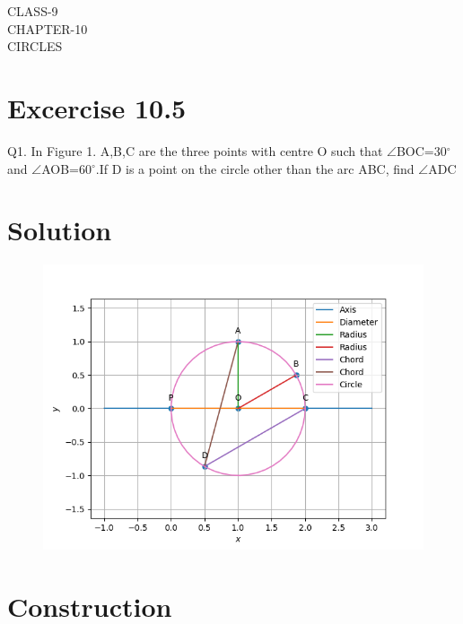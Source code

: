 \documentclass[12pt]{article}
\begin{document}
\begin{center}
\textbf\large{CLASS-9\\CHAPTER-10 \\ CIRCLES}

\end{center}
\section*{Excercise 10.5}

Q1. In Figure 1. A,B,C are the three points with centre O such that $\angle$BOC=30$^\circ$ and $\angle$AOB=60$^\circ$.If D is a point on the circle other than the arc ABC, find $\angle$ADC
\section*{\large Solution}
\begin{figure}[h!]
\centering
\includegraphics[width=\columnwidth]{figs/circle2.png}
\caption{}
\end{figure}
\section*{\large Construction}
\end{document}
